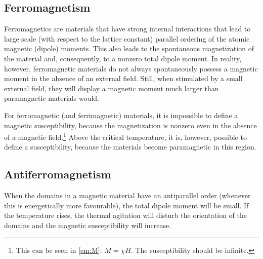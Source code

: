 \subsection{Ferromagnetism}

    Ferromagnetics are materials that have strong internal interactions that lead to large scale (with respect to the lattice constant) parallel ordering of the atomic magnetic (dipole) moments. This also leads to the spontaneous magnetization of the material and, consequently, to a nonzero total dipole moment. In reality, however, ferromagnetic materials do not always spontaneously possess a magnetic moment in the absence of an external field. Still, when stimulated by a small external field, they will display a magnetic moment much larger than paramagnetic materials would.


    \begin{remark}
        For ferromagnetic (and ferrimagnetic) materials, it is impossible to define a magnetic susceptibility, because the magnetization is nonzero even in the absence of a magnetic field.\footnote{This can be seen in \cref{em:M}: $M=\chi H$. The susceptibility should be infinite.} Above the critical temperature, it is, however, possible to define a susceptibility, because the materials become paramagnetic in this region.
    \end{remark}

\subsection{Antiferromagnetism}

    When the domains in a magnetic material have an antiparallel order (whenever this is energetically more favourable), the total dipole moment will be small. If the temperature rises, the thermal agitation will disturb the orientation of the domains and the magnetic susceptibility will increase.

